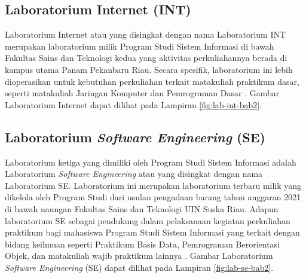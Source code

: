 
\subsection{Laboratorium Internet (INT)}
Laboratorium Internet atau yang disingkat dengan nama Laboratorium INT merupakan laboratorium milik Program Studi Sistem Informasi di bawah Fakultas Sains dan Teknologi kedua yang aktivitas perkuliahannya berada di kampus utama Panam Pekanbaru Riau. Secara spesifik, laboratorium ini lebih dioperasikan untuk kebutuhan perkuliahan terkait matakuliah praktikum dasar, seperti matakuliah Jaringan Komputer dan Pemrograman Dasar \cite{labsi2023}. Gambar Laboratorium Internet dapat dilihat pada Lampiran \ref{fig:lab-int-bab2}.


\subsection{Laboratorium \textit{Software Engineering} (SE)}
Laboratorium ketiga yang dimiliki oleh Program Studi Sistem Informasi adalah Laboratorium \textit{Software Engineering} atau yang disingkat dengan nama Laboratorium SE. Laboratorium ini merupakan laboratorium terbaru milik yang dikelola oleh Program Studi dari usulan pengadaan barang tahun anggaran 2021 di bawah naungan Fakultas Sains dan Teknologi UIN Suska Riau. Adapun laboratorium SE sebagai pendukung dalam pelaksanaan kegiatan perkuliahan praktikum bagi mahasiswa Program Studi Sistem Informasi yang terkait dengan bidang keilmuan seperti Praktikum Basis Data, Pemrograman Berorientasi Objek, dan matakuliah wajib praktikum lainnya \cite{labsi2023}. Gambar Laboratorium \textit{Software Engineering} (SE) dapat dilihat pada Lampiran \ref{fig:lab-se-bab2}.

